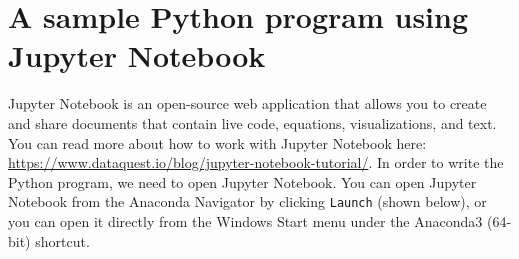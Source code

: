 \documentclass[12pt]{article}
\newcommand{\link}[1]{{\small\url{#1}}}
\begin{document}
%
%
%
%

\section{A sample Python program using Jupyter Notebook}

Jupyter Notebook is an open-source web application that allows you to create and share documents that contain live code, equations, visualizations, and text.  You can read more about how to work with Jupyter Notebook here:  \link{https://www.dataquest.io/blog/jupyter-notebook-tutorial/}.  In order to write the Python program, we need to open Jupyter Notebook.  You can open Jupyter Notebook from the Anaconda Navigator by clicking {\tt Launch} (shown below), or you can open it directly from the Windows Start menu under the Anaconda3 (64-bit) shortcut.
\end{document}
